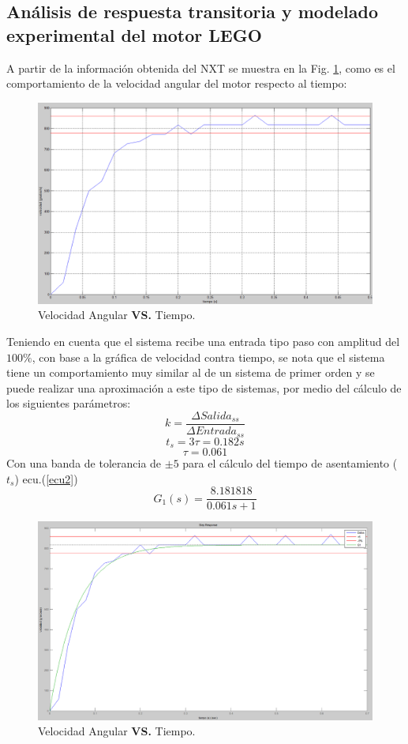 \documentclass[twocolumn]{IEEEtran}
\begin{document}
\subsection{Análisis de respuesta transitoria y modelado experimental del motor LEGO}
\noindent
A partir de la información obtenida del NXT se muestra en la Fig. \ref{fig1}, como es el comportamiento de la velocidad angular del motor respecto al tiempo:
\begin{figure}[H]
	\centering
		\includegraphics[scale=0.17]{figure1.png}
	\caption{Velocidad Angular \textbf{VS.} Tiempo.}
	\label{fig1}
\end{figure}
\noindent
Teniendo en cuenta que el sistema recibe una entrada tipo paso con amplitud del $100\%$, con base a la gráfica de velocidad contra tiempo, se nota que el sistema tiene un comportamiento muy similar al de un sistema de primer orden y se puede realizar una aproximación a este tipo de sistemas, por medio del cálculo de los siguientes parámetros:
\begin{equation}
 k=\frac{\Delta Salida_{ss}}{\Delta Entrada_{ss}}
\label{ecu1}
\end{equation}
$$t_s=3 \tau=0.182s$$
$$\tau=0.061$$
\noindent
Con una banda de tolerancia de $\pm 5$ para el cálculo del tiempo de asentamiento ($t_s$) ecu.(\ref{ecu2})
\begin{equation}
 G_{1}(s)=\frac{8.181818}{0.061s+1}
\label{ecu2}
\end{equation}
\begin{figure}[H]
	\centering
		\includegraphics[scale=0.17]{figure2.png}
	\caption{Velocidad Angular \textbf{VS.} Tiempo.}
	\label{fig2}
\end{figure}
\end{document}
